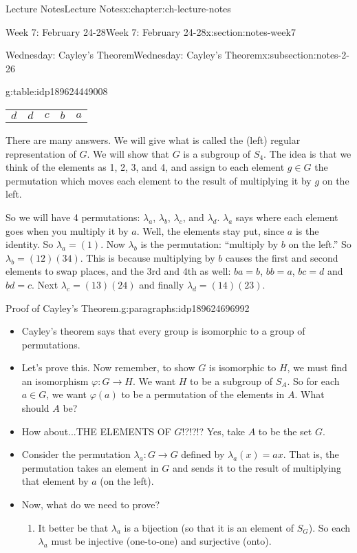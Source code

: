 \documentclass[oneside,11pt,]{book}
\begin{document}
\begin{chapterptx}{Lecture Notes}{}{Lecture Notes}{}{}{x:chapter:ch-lecture-notes}
\begin{sectionptx}{Week 7: February 24-28}{}{Week 7: February 24-28}{}{}{x:section:notes-week7}
\begin{subsectionptx}{Wednesday: Cayley's Theorem}{}{Wednesday: Cayley's Theorem}{}{}{x:subsection:notes-2-26}
\begin{itemize}[label=\textbullet]
\begin{tableptx}{\textbf{}}{g:table:idp189624449008}{}
{\begin{tabular}{lllll}
\multicolumn{1}{c}{\(d\)}&\multicolumn{1}{c}{\(d\)}&\multicolumn{1}{c}{\(c\)}&\multicolumn{1}{c}{\(b\)}&\multicolumn{1}{c}{\(a\)}
\end{tabular}
}%
\end{tableptx}%
There are many answers. We will give what is called the (left) regular representation of \(G\). We will show that \(G\) is a subgroup of \(S_4\). The idea is that we think of the elements as 1, 2, 3, and 4, and assign to each element \(g \in G\) the permutation which moves each element to the result of multiplying it by \(g\) on the left.%
\par
So we will have 4 permutations: \(\lambda_a\),            \(\lambda_b\),            \(\lambda_c\), and \(\lambda_d\).            \(\lambda_a\) says where each element goes when you multiply it by \(a\). Well, the elements stay put, since \(a\) is the identity. So \(\lambda_a = (1)\). Now \(\lambda_b\) is the permutation: ``multiply by \(b\) on the left.'' So \(\lambda_b = (12)(34)\). This is because multiplying by \(b\) causes the first and second elements to swap places, and the 3rd and 4th as well: \(ba = b\),          \(bb = a\),          \(bc = d\) and \(bd = c\). Next \(\lambda_c = (13)(24)\) and finally \(\lambda_d = (14)(23)\).%
\end{itemize}
%
\begin{paragraphs}{Proof of Cayley’s Theorem.}{g:paragraphs:idp189624696992}%
%
\begin{itemize}[label=\textbullet]
\item{}Cayley’s theorem says that every group is isomorphic to a group of permutations.%
\item{}Let’s prove this. Now remember, to show \(G\) is isomorphic to \(H\), we must find an isomorphism \(\varphi:G \to H\). We want \(H\) to be a subgroup of \(S_A\). So for each \(a \in G\), we want \(\varphi(a)\) to be a permutation of the elements in \(A\). What should \(A\) be?%
\item{}How about...THE ELEMENTS OF \(G\)!?!?!? Yes, take \(A\) to be the set \(G\).%
\item{}Consider the permutation \(\lambda_a:G \to G\) defined by \(\lambda_a(x) = ax\). That is, the permutation takes an element in \(G\) and sends it to the result of multiplying that element by \(a\) (on the left).%
\item{}Now, what do we need to prove?%
\begin{enumerate}
\item{}It better be that \(\lambda_a\) is a bijection (so that it is an element of \(S_G\)).  So each \(\lambda_a\) must be injective (one-to-one) and surjective (onto).%

\end{enumerate}
\end{itemize}
\end{paragraphs}
\end{subsectionptx}
\end{sectionptx}
\end{chapterptx}
\end{document}
